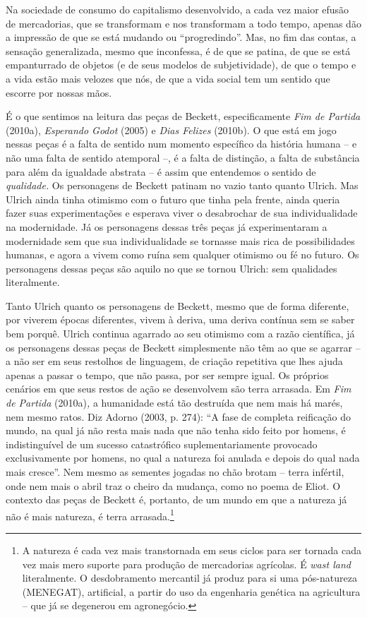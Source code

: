 Na sociedade de consumo do capitalismo desenvolvido, a cada vez maior
efusão de mercadorias, que se transformam e nos transformam a todo
tempo, apenas dão a impressão de que se está mudando ou ``progredindo''.
Mas, no fim das contas, a sensação generalizada, mesmo que inconfessa, é
de que se patina, de que se está empanturrado de objetos (e de seus
modelos de subjetividade), de que o tempo e a vida estão mais velozes
que nós, de que a vida social tem um sentido que escorre por nossas
mãos.

É o que sentimos na leitura das peças de Beckett, especificamente
\emph{Fim de Partida} (2010a), \emph{Esperando Godot} (2005) e
\emph{Dias Felizes} (2010b). O que está em jogo nessas peças é a falta
de sentido num momento específico da história humana -- e não uma falta
de sentido atemporal --, é a falta de distinção, a falta de substância
para além da igualdade abstrata -- é assim que entendemos o sentido de
\emph{qualidade.} Os personagens de Beckett patinam no vazio tanto
quanto Ulrich. Mas Ulrich ainda tinha otimismo com o futuro que tinha
pela frente, ainda queria fazer suas experimentações e esperava viver o
desabrochar de sua individualidade na modernidade. Já os personagens
dessas três peças já experimentaram a modernidade sem que sua
individualidade se tornasse mais rica de possibilidades humanas, e agora
a vivem como ruína sem qualquer otimismo ou fé no futuro. Os personagens
dessas peças são aquilo no que se tornou Ulrich: sem qualidades
literalmente.

Tanto Ulrich quanto os personagens de Beckett, mesmo que de forma
diferente, por viverem épocas diferentes, vivem à deriva, uma deriva
contínua sem se saber bem porquê. Ulrich continua agarrado ao seu
otimismo com a razão científica, já os personagens dessas peças de
Beckett simplesmente não têm ao que se agarrar -- a não ser em seus
restolhos de linguagem, de criação repetitiva que lhes ajuda apenas a
passar o tempo, que não passa, por ser sempre igual. Os próprios
cenários em que seus restos de ação se desenvolvem são terra arrasada.
Em \emph{Fim de Partida} (2010a)\emph{,} a humanidade está tão destruída
que nem mais há marés, nem mesmo ratos. Diz Adorno (2003, p. 274): ``A
fase de completa reificação do mundo, na qual já não resta mais nada que
não tenha sido feito por homens, é indistinguível de um sucesso
catastrófico suplementariamente provocado exclusivamente por homens, no
qual a natureza foi anulada e depois do qual nada mais cresce''. Nem
mesmo as sementes jogadas no chão brotam -- terra infértil, onde nem
mais o abril traz o cheiro da mudança, como no poema de Eliot. O
contexto das peças de Beckett é, portanto, de um mundo em que a natureza
já não é mais natureza, é terra arrasada.\footnote{A natureza é cada vez
  mais transtornada em seus ciclos para ser tornada cada vez mais mero
  suporte para produção de mercadorias agrícolas. É \emph{wast land}
  literalmente. O desdobramento mercantil já produz para si uma
  pós-natureza (MENEGAT), artificial, a partir do uso da engenharia
  genética na agricultura -- que já se degenerou em agronegócio.}

